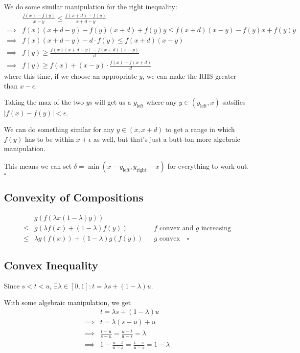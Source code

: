 \documentclass[12pt]{article}
\begin{document}
We do some similar manipulation for the right inequality:
\begin{align*}
             & \frac{f(x)-f(y)}{x-y} \le \frac{f(x+d)-f(y)}{x+d-y}         \\
  \implies{} & f(x)(x+d-y)-f(y)(x+d)+f(y)y \le f(x+d)(x-y) - f(y)x + f(y)y \\
  \implies{} & f(x)(x+d-y)-d \cdot f(y) \le f(x+d)(x-y)                    \\
  \implies{} & f(y) \ge \frac{f(x)(x+d-y)-f(x+d)(x-y)}{d}                  \\
  \implies{} & f(y) \ge f(x)+(x-y) \cdot \frac{f(x)-f(x+d)}{d}
\end{align*}
where this time, if we choose an appropriate $y$, we can make the RHS greater than $x-\epsilon$.

Taking the max of the two $y$s will get us a $y_\text{left}$
where any $y \in (y_\text{left}, x)$ satsifies $|f(x)-f(y)| < \epsilon$.

We can do something similar for any $y \in (x, x+d)$ to get a range
in which $f(y)$ has to be within $x \pm \epsilon$ as well,
but that's just a butt-ton more algebraic manipulation.

This means we can set $\delta=\min(x-y_\text{left}, y_\text{right}-x)$ for everything to work out. $\square$

\pagebreak

\subsection{Convexity of Compositions}

\[\begin{aligned}
          & g(f(\lambda x (1-\lambda)y))                                                    \\
    \le{} & g(\lambda f(x) + (1 - \lambda) f(y))  &  & \text{$f$ convex and $g$ increasing} \\
    \le{} & \lambda g(f(x)) + (1-\lambda) g(f(y)) &  & \text{$g$ convex}\quad\square
  \end{aligned}\]

\subsection{Convex Inequality}\label{sec:prob2p3}

Since $s < t < u$, $\exists \lambda \in [0, 1]: t = \lambda s + (1 - \lambda)u$.

With some algebraic manipulation, we get
\begin{align*}
             & t = \lambda s + (1 - \lambda)u               \\
  \implies{} & t = \lambda(s-u)+u                           \\
  \implies{} & \frac{t-u}{s-u} = \frac{u-t}{u-s}= \lambda   \\
  \implies{} & 1-\frac{u-t}{u-s}=\frac{t-s}{u-s}= 1-\lambda
\end{align*}
\end{document}
